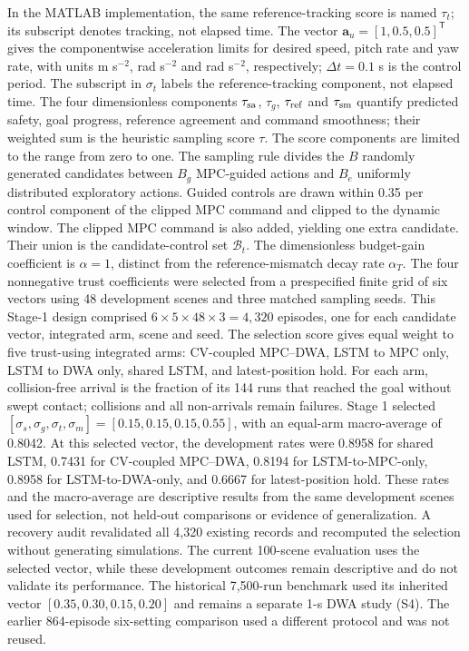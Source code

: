 \documentclass[10pt]{article}
\begin{document}
In the MATLAB implementation, the same reference-tracking score is named $\tau_t$; its subscript denotes tracking, not elapsed time.
The vector $\mathbf a_u=[1,0.5,0.5]^{\mathsf T}$ gives the componentwise acceleration limits for desired speed, pitch rate and yaw rate, with units m s$^{-2}$, rad s$^{-2}$ and rad s$^{-2}$, respectively; $\Delta t=0.1$ s is the control period. The subscript in $\sigma_t$ labels the reference-tracking component, not elapsed time. The four dimensionless components $\tau_{\rm sa}$, $\tau_g$, $\tau_{\rm ref}$ and $\tau_{\rm sm}$ quantify predicted safety, goal progress, reference agreement and command smoothness; their weighted sum is the heuristic sampling score $\tau$.
The score components are limited to the range from zero to one. The sampling rule divides the $B$ randomly generated candidates between $B_g$ MPC-guided actions and $B_e$ uniformly distributed exploratory actions. Guided controls are drawn within 0.35 per control component of the clipped MPC command and clipped to the dynamic window. The clipped MPC command is also added, yielding one extra candidate. Their union is the candidate-control set $\mathcal B_t$. The dimensionless budget-gain coefficient is $\alpha=1$, distinct from the reference-mismatch decay rate $\alpha_T$.
The four nonnegative trust coefficients were selected from a prespecified finite grid of six vectors using 48 development scenes and three matched sampling seeds. This Stage-1 design comprised $6\times5\times48\times3=4{,}320$ episodes, one for each candidate vector, integrated arm, scene and seed. The selection score gives equal weight to five trust-using integrated arms: CV-coupled MPC--DWA, LSTM to MPC only, LSTM to DWA only, shared LSTM, and latest-position hold. For each arm, collision-free arrival is the fraction of its 144 runs that reached the goal without swept contact; collisions and all non-arrivals remain failures. Stage 1 selected $[\sigma_s,\sigma_g,\sigma_t,\sigma_m]=[0.15,0.15,0.15,0.55]$, with an equal-arm macro-average of 0.8042. At this selected vector, the development rates were 0.8958 for shared LSTM, 0.7431 for CV-coupled MPC--DWA, 0.8194 for LSTM-to-MPC-only, 0.8958 for LSTM-to-DWA-only, and 0.6667 for latest-position hold. These rates and the macro-average are descriptive results from the same development scenes used for selection, not held-out comparisons or evidence of generalization. A recovery audit revalidated all 4,320 existing records and recomputed the selection without generating simulations. The current 100-scene evaluation uses the selected vector, while these development outcomes remain descriptive and do not validate its performance. The historical 7,500-run benchmark used its inherited vector $[0.35,0.30,0.15,0.20]$ and remains a separate 1-s DWA study (S4). The earlier 864-episode six-setting comparison used a different protocol and was not reused.
\end{document}
